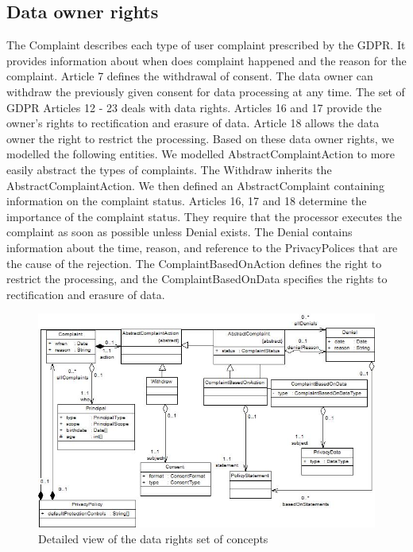 \documentclass[11pt,english]{article}
\begin{document}
\subsection{Data owner rights}
The Complaint describes each type of user complaint prescribed by the GDPR. It provides information about when does complaint happened and the reason for the complaint. Article 7 defines the withdrawal of consent. The data owner can withdraw the previously given consent for data processing at any time. The set of GDPR Articles 12 - 23 deals with data rights. Articles 16 and 17 provide the owner's rights to rectification and erasure of data. Article 18 allows the data owner the right to restrict the processing. Based on these data owner rights, we modelled the following entities. \newline We modelled AbstractComplaintAction to more easily abstract the types of complaints. The Withdraw inherits the AbstractComplaintAction. We then defined an AbstractComplaint containing information on the complaint status. Articles 16, 17 and 18 determine the importance of the complaint status. They require that the processor executes the complaint as soon as possible unless Denial exists. The Denial contains information about the time, reason, and reference to the PrivacyPolices that are the cause of the rejection. The ComplaintBasedOnAction defines the right to restrict the processing, and the ComplaintBasedOnData specifies the rights to rectification and erasure of data.
\begin{figure}[H]
    \centering
    \includegraphics[width=12.5cm]{images/dataRights.jpg}
    \caption{Detailed view of the data rights set of concepts}
    \label{fig:DataRights}
\end{figure}
\end{document}
